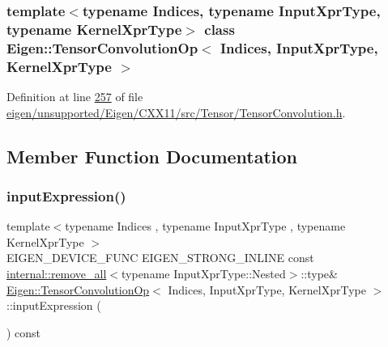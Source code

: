 \subsubsection*{template$<$typename Indices, typename Input\+Xpr\+Type, typename Kernel\+Xpr\+Type$>$\newline
class Eigen\+::\+Tensor\+Convolution\+Op$<$ Indices, Input\+Xpr\+Type, Kernel\+Xpr\+Type $>$}



Definition at line \hyperlink{eigen_2unsupported_2_eigen_2_c_x_x11_2src_2_tensor_2_tensor_convolution_8h_source_l00257}{257} of file \hyperlink{eigen_2unsupported_2_eigen_2_c_x_x11_2src_2_tensor_2_tensor_convolution_8h_source}{eigen/unsupported/\+Eigen/\+C\+X\+X11/src/\+Tensor/\+Tensor\+Convolution.\+h}.



\subsection{Member Function Documentation}
\mbox{\label{class_eigen_1_1_tensor_convolution_op_a57097fbe6e0a033d587e98654f0bd664}} 
\subsubsection{\texorpdfstring{input\+Expression()}{inputExpression()}\hspace{0.1cm}{\footnotesize\ttfamily [1/2]}}
{\footnotesize\ttfamily template$<$typename Indices , typename Input\+Xpr\+Type , typename Kernel\+Xpr\+Type $>$ \\
E\+I\+G\+E\+N\+\_\+\+D\+E\+V\+I\+C\+E\+\_\+\+F\+U\+NC E\+I\+G\+E\+N\+\_\+\+S\+T\+R\+O\+N\+G\+\_\+\+I\+N\+L\+I\+NE const \hyperlink{struct_eigen_1_1internal_1_1remove__all}{internal\+::remove\+\_\+all}$<$typename Input\+Xpr\+Type\+::\+Nested$>$\+::type\& \hyperlink{class_eigen_1_1_tensor_convolution_op}{Eigen\+::\+Tensor\+Convolution\+Op}$<$ Indices, Input\+Xpr\+Type, Kernel\+Xpr\+Type $>$\+::input\+Expression (\begin{DoxyParamCaption}{ }\end{DoxyParamCaption}) const\hspace{0.3cm}{\ttfamily [inline]}}

